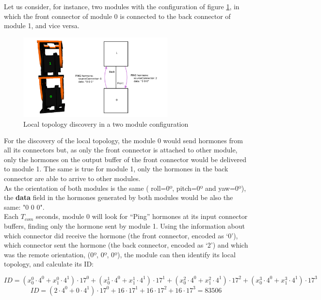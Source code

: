 Let us consider, for instance, two modules with the configuration of figure \ref{fig:hormone_protocol_01}, in which the front connector of module 0 is connected to the back connector of module 1, and vice versa. \\

\begin{figure}[h]
	\centering
	\includegraphics[width=0.7\textwidth]{images/Hormone_protocol_01.png}
	\caption{Local topology discovery in a two module configuration}\label{fig:hormone_protocol_01}
\end{figure}

For the discovery of the local topology, the module 0 would send hormones from all its connectors but, as only the front connector is attached to other module, only the hormones on the output buffer of the front connector would be delivered to module 1. The same is true for module 1, only the hormones in the back connector are able to arrive to other modules.\\

As the orientation of both modules is the same ( roll=0º, pitch=0º and yaw=0º), the \textbf{data} field in the hormones generated by both modules would be also the same: "0 0 0". \\

Each $T_{com}$ seconds, module 0 will look for ``Ping'' hormones at its input connector buffers, finding only the hormone sent by module 1. Using the information about which connector did receive the hormone (the front connector, encoded as `0'), which connector sent the hormone (the back connector, encoded as `2') and which was the remote orientation, (0º, 0º, 0º),  the module can then identify its local topology, and calculate its ID:

\[ ID = ( x_0^0 \cdot 4^0+ x_1^0 \cdot 4^1) \cdot 17^0 +
 ( x_0^1 \cdot 4^0+ x_1^1 \cdot 4^1) \cdot 17^1 +
  ( x_0^2 \cdot 4^0+ x_1^2 \cdot 4^1) \cdot 17^2 +
   ( x_0^3 \cdot 4^0+ x_1^3 \cdot 4^1) \cdot 17^3 \]
\[ ID = ( 2 \cdot 4^0 + 0 \cdot 4^1 ) \cdot 17^0 +
 16 \cdot 17^1 +
 16 \cdot 17^2 +
 16 \cdot 17^3 = 83506 \]\\
 
